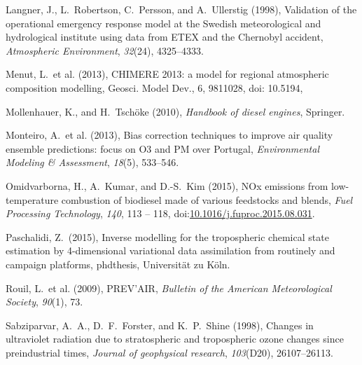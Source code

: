 \documentclass[9pt]{report}
\begin{document}
{\begin{thebibliography}{28}
\mdbibitemlabel{}Langner, J., L.~Robertson, C.~Persson, and A.~Ullerstig (1998), Validation of the operational emergency response model at the Swedish meteorological and hydrological institute using data from ETEX and the Chernobyl accident, \emph{Atmospheric Environment}, \emph{32}(24), 4325–4333.\label{langner1998validation}%

\mdbibitemlabel{}Menut, L.~et al. (2013), CHIMERE 2013: a model for regional atmospheric composition modelling, Geosci. Model Dev., 6, 981\textendash{}1028, doi: 10.5194,\label{menut2013chimere}%

\mdbibitemlabel{}Mollenhauer, K., and H.~Tschöke (2010), \emph{Handbook of diesel engines}, Springer.\label{mollenhauer2010handbook}%

\mdbibitemlabel{}Monteiro, A.~et al. (2013), Bias correction techniques to improve air quality ensemble predictions: focus on O3 and PM over Portugal, \emph{Environmental Modeling \& Assessment}, \emph{18}(5), 533–546.\label{monteiro2013bias}%

\mdbibitemlabel{}Omidvarborna, H., A.~Kumar, and D.-S.~Kim (2015), NOx emissions from low-temperature combustion of biodiesel made of various feedstocks and blends, \emph{Fuel Processing Technology}, \emph{140}, 113 – 118, doi:\href{https://dx.doi.org/10.1016/j.fuproc.2015.08.031}{10.1016/j.fuproc.2015.08.031}.\label{omidvarborna2015113}%

\mdbibitemlabel{}Paschalidi, Z.~(2015), Inverse modelling for the tropospheric chemical state estimation by 4-dimensional variational data assimilation from routinely and campaign platforms, phdthesis, Universit\"{a}t zu K\"{o}ln.\label{paschalidi2015inverse}%

\mdbibitemlabel{}Rouil, L.~et al. (2009), PREV’AIR, \emph{Bulletin of the American Meteorological Society}, \emph{90}(1), 73.\label{rouil2009prev}%

\mdbibitemlabel{}Sabziparvar, A.~A., D.~F.~Forster, and K.~P.~Shine (1998), Changes in ultraviolet radiation due to stratospheric and tropospheric ozone changes since preindustrial times, \emph{Journal of geophysical research}, \emph{103}(D20), 26107–26113.\label{sabziparvar1998changes}%


\end{thebibliography}}
\end{document}
